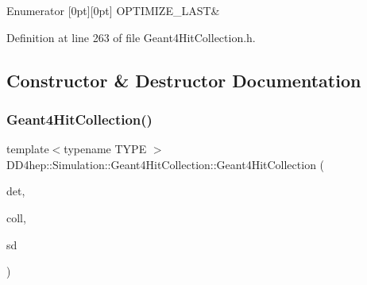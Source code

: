 \begin{DoxyEnumFields}{Enumerator}
[0pt][0pt]{}\hypertarget{class_d_d4hep_1_1_simulation_1_1_geant4_hit_collection_a8fe757ca872800562e5317df0597c844ac14cd6ddf70dd174f944eca4790515b8}{}\label{class_d_d4hep_1_1_simulation_1_1_geant4_hit_collection_a8fe757ca872800562e5317df0597c844ac14cd6ddf70dd174f944eca4790515b8} 
O\+P\+T\+I\+M\+I\+Z\+E\+\_\+\+L\+A\+ST&\\
\hline

\end{DoxyEnumFields}


Definition at line 263 of file Geant4\+Hit\+Collection.\+h.



\subsection{Constructor \& Destructor Documentation}
\hypertarget{class_d_d4hep_1_1_simulation_1_1_geant4_hit_collection_a8b32b65a07b61a5a5bd339ea39ef2e0f}{}\label{class_d_d4hep_1_1_simulation_1_1_geant4_hit_collection_a8b32b65a07b61a5a5bd339ea39ef2e0f} 
\subsubsection{\texorpdfstring{Geant4\+Hit\+Collection()}{Geant4HitCollection()}\hspace{0.1cm}{\footnotesize\ttfamily [1/2]}}
{\footnotesize\ttfamily template$<$typename T\+Y\+PE $>$ \\
D\+D4hep\+::\+Simulation\+::\+Geant4\+Hit\+Collection\+::\+Geant4\+Hit\+Collection (\begin{DoxyParamCaption}\item[{const std\+::string \&}]{det,  }\item[{const std\+::string \&}]{coll,  }\item[{\hyperlink{class_d_d4hep_1_1_simulation_1_1_geant4_sensitive}{Geant4\+Sensitive} $\ast$}]{sd }\end{DoxyParamCaption})\hspace{0.3cm}{\ttfamily [inline]}}




